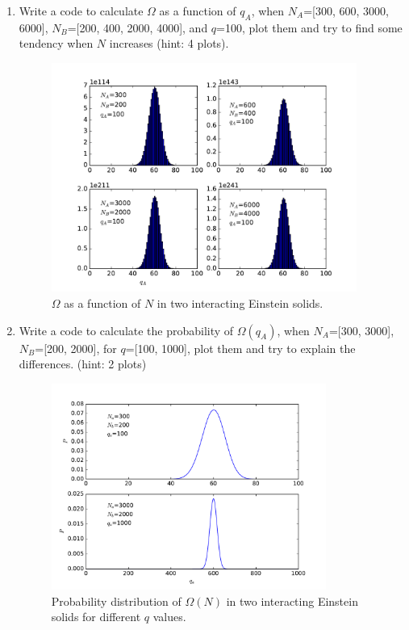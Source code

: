 \documentclass[twoside]{article}
\begin{document}
\begin{enumerate}
\item Write a code to calculate $\Omega$ as a function of $q_A$, when $N_A$=[300, 600, 3000, 6000], $N_B$=[200, 400, 2000, 4000],
and $q$=100, plot them and try to find some tendency when $N$ increases (hint: 4 plots).
\begin{figure}[h]
\centering
\includegraphics[width=10cm]{imgs/Einstein.pdf}
\caption{$\Omega$ as a function of $N$ in two interacting Einstein solids. }
\end{figure}

\item Write a code to calculate the probability of $\Omega(q_A)$, when $N_A$=[300, 3000], $N_B$=[200, 2000],
for $q$=[100, 1000], plot them and try to explain the differences. (hint: 2 plots)

\begin{figure}[h]
\centering
\includegraphics[width=9cm]{imgs/Einstein2.pdf}
\caption{Probability distribution of $\Omega(N)$ in two interacting Einstein solids for different $q$ values. }
\end{figure}

\end{enumerate}
\end{document}
